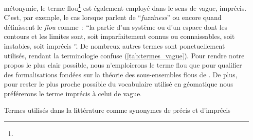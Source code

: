 métonymie, le terme flou\footnote{} est également employé dans le sens
de vague, imprécis. C’est, par exemple, le cas lorsque
\textcite{Lagacherie1996} parlent de \enquote{\emph{fuzziness}} ou
encore quand \textcite[p. 218]{Brunet1992} définissent le \emph{flou}
comme : \enquote{la partie d’un système ou d’un espace dont les
  contours et les limites sont, soit imparfaitement connus ou
  connaissables, soit instables, soit imprécis \textelp{}}. De
nombreux autres termes sont ponctuellement utilisés, rendant la
terminologie confuse (\autoref{tab:termes_vague}). Pour rendre notre
propos le plus clair possible, nous n’emploierons le terme flou que
pour qualifier des formalisations fondées sur la théorie des
sous-ensembles flous de \textcite{Zadeh1965}. De plus, pour rester le
plus proche possible du vocabulaire utilisé en géomatique nous
préférerons le terme imprécis à celui de vague.

\begin{table}
  \centering
  
  \caption{Termes utilisés dans la littérature comme synonymes de
    précis et d’imprécis}
  \label{tab:termes_vague}
\end{table}

